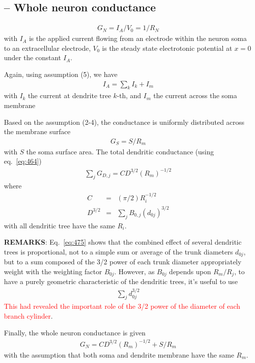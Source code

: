 \subsection{-- Whole neuron conductance}
\label{sec:whole-neur-cond}

\begin{eqnarray}
  \label{eq:471}
  G_N = I_A/V_0 = 1/R_N
\end{eqnarray}
with $I_A$ is the applied current flowing from an electrode within the
neuron soma to an extracellular electrode, $V_0$ is the steady state
electrotonic potential at $x=0$ under the constant $I_A$.

Again, using assumption (5), we have
\begin{eqnarray}
  \label{eq:472}
  I_A = \sum_k I_{k} + I_m
\end{eqnarray}
with $I_k$ the current at dendrite tree $k$-th, and $I_m$ the current
across the soma membrane

Based on the assumption (2-4), the conductance is uniformly
distributed across the membrane surface
\begin{eqnarray}
  \label{eq:473}
  G_S = S/R_m
\end{eqnarray}
with $S$ the soma surface area.  The total dendritic conductance
(using eq.~\eqref{eq:464})
\begin{eqnarray}
  \label{eq:474}
  \sum_j G_{D,j} = CD^{3/2}(R_m)^{-1/2}
\end{eqnarray}
where
\begin{eqnarray}
  \label{eq:475}
  C &=& (\pi/2) R_i^{-1/2} \\
  D^{3/2} &=& \sum_j B_{0,j}(d_{0j})^{3/2}
\end{eqnarray}
with all dendritic tree have the same $R_i$.

{\bf REMARKS}: Eq.~\eqref{eq:475} shows that the combined effect of
several dendritic trees is proportional, not to a simple sum or
average of the trunk diameters $d_{0j}$, but to a sum composed of the
3/2 power of each trunk diameter appropriately weight with the
weighting factor $B_{0j}$. However, as $B_{0j}$ depends upon
$R_m/R_j$, to have a purely geometric characteristic of the dendritic
trees, it's useful to use~\cite{rall1959bdt}
\begin{eqnarray}
  \label{eq:480}
  \sum_j d_{0j}^{3/2}
\end{eqnarray}
\textcolor{red}{This had revealed the important role of the 3/2 power
  of the diameter of each branch cylinder}.

Finally, the whole neuron conductance is given
\begin{eqnarray}
  \label{eq:476}
  G_N = CD^{3/2}(R_m)^{-1/2} + S/R_m
\end{eqnarray}
with the assumption that both soma and dendrite membrane have the same
$R_m$. 

